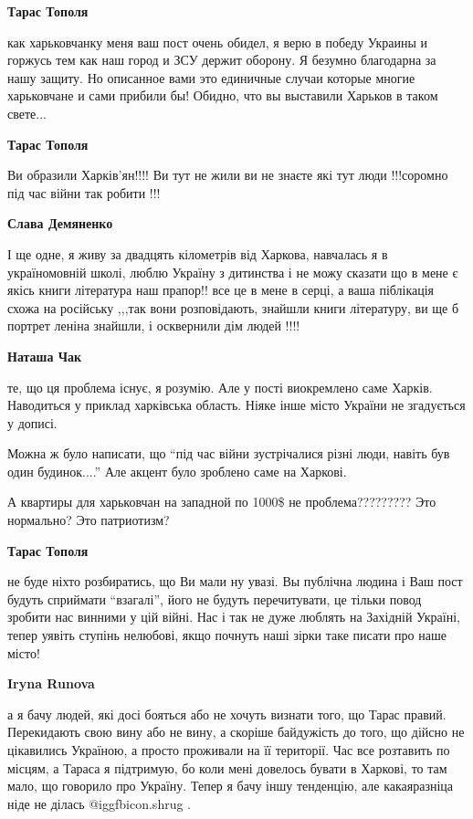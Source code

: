 \begin{itemize}
\begin{itemize}
\textbf{Тарас Тополя} 

как харьковчанку меня ваш пост очень обидел, я верю в победу Украины и горжусь
тем как наш город и ЗСУ держит оборону. Я безумно благодарна за нашу защиту. Но
описанное вами это единичные случаи которые многие харьковчане и сами прибили
бы! Обидно, что вы выставили Харьков в таком свете...

\textbf{Тарас Тополя} 

Ви образили Харків'ян!!!! Ви тут не жили ви не знаєте які тут люди !!!соромно
під час війни так робити !!!

\textbf{Слава Демяненко} 

І ще одне, я живу за двадцять кілометрів від Харкова, навчалась я в україномовній
школі, люблю Україну з дитинства і не можу сказати що в мене є якісь книги
література наш прапор!! все це в мене в серці, а ваша піблікація схожа на
російську ,,,так вони розповідають, знайшли книги літературу, ви ще б портрет
леніна знайшли, і осквернили дім людей !!!!

\textbf{Наташа Чак} 

те, що ця проблема існує, я розумію. Але у пості виокремлено саме Харків.
Наводиться у приклад харківська область. Ніяке інше місто України не згадується
у дописі.

Можна ж було написати, що \enquote{під час війни зустрічалися різні люди,
навіть був один будинок....} Але акцент було зроблено саме на Харкові.


А квартиры для харьковчан на западной по 1000\$ не проблема????????? Это
нормально? Это патриотизм?

\textbf{Тарас Тополя} 

не буде ніхто розбиратись, що Ви мали ну увазі. Вы публічна людина і Ваш пост
будуть сприймати \enquote{взагалі}, його не будуть перечитувати, це тільки повод
зробити нас винними у цій війні. Нас і так не дуже люблять на Західній Україні,
тепер уявіть ступінь нелюбові, якщо почнуть наші зірки таке писати про наше
місто!

\textbf{Iryna Runova} 

а я бачу людей, які досі бояться або не хочуть визнати того, що Тарас правий.
Перекидають свою вину або не вину, а скоріше байдужість до того, що дійсно не
цікавились Україною, а просто проживали на її території. Час все розтавить по
місцям, а Тараса я підтримую, бо коли мені довелось бувати в Харкові, то там
мало, що говорило про Україну. Тепер я бачу іншу тенденцію, але какаяразніца
ніде не ділась  @igg{fbicon.shrug} .


\end{itemize}
\end{itemize}
